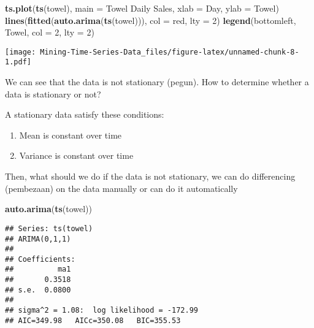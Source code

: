 \documentclass[
]{article}
\newenvironment{Shaded}{\begin{snugshade}}{\end{snugshade}}
\newcommand{\AttributeTok}[1]{\textcolor[rgb]{0.13,0.29,0.53}{#1}}
\newcommand{\DecValTok}[1]{\textcolor[rgb]{0.00,0.00,0.81}{#1}}
\newcommand{\FunctionTok}[1]{\textcolor[rgb]{0.13,0.29,0.53}{\textbf{#1}}}
\newcommand{\NormalTok}[1]{#1}
\newcommand{\StringTok}[1]{\textcolor[rgb]{0.31,0.60,0.02}{#1}}
\providecommand{\tightlist}{%
  \setlength{\itemsep}{0pt}\setlength{\parskip}{0pt}}
\begin{document}
\begin{Shaded}
\begin{Highlighting}[]
\FunctionTok{ts.plot}\NormalTok{(}\FunctionTok{ts}\NormalTok{(towel), }\AttributeTok{main =} \StringTok{\textquotesingle{}Towel Daily Sales\textquotesingle{}}\NormalTok{, }\AttributeTok{xlab =} \StringTok{\textquotesingle{}Day\textquotesingle{}}\NormalTok{, }\AttributeTok{ylab =} \StringTok{\textquotesingle{}Towel\textquotesingle{}}\NormalTok{)}
\FunctionTok{lines}\NormalTok{(}\FunctionTok{fitted}\NormalTok{(}\FunctionTok{auto.arima}\NormalTok{(}\FunctionTok{ts}\NormalTok{(towel))), }\AttributeTok{col =} \StringTok{\textquotesingle{}red\textquotesingle{}}\NormalTok{, }\AttributeTok{lty =} \DecValTok{2}\NormalTok{)}
\FunctionTok{legend}\NormalTok{(}\StringTok{\textquotesingle{}bottomleft\textquotesingle{}}\NormalTok{, }\StringTok{\textquotesingle{}Towel\textquotesingle{}}\NormalTok{, }\AttributeTok{col =} \DecValTok{2}\NormalTok{, }\AttributeTok{lty =} \DecValTok{2}\NormalTok{)}
\end{Highlighting}
\end{Shaded}

\texttt{[image: Mining-Time-Series-Data\_files/figure-latex/unnamed-chunk-8-1.pdf]}

We can see that the data is not stationary (pegun). How to determine
whether a data is stationary or not?

A stationary data satisfy these conditions:

\begin{enumerate}
\def\labelenumi{\arabic{enumi}.}
\tightlist
\item
  Mean is constant over time
\item
  Variance is constant over time
\end{enumerate}

Then, what should we do if the data is not stationary, we can do
differencing (pembezaan) on the data manually or can do it automatically

\begin{Shaded}
\begin{Highlighting}[]
\FunctionTok{auto.arima}\NormalTok{(}\FunctionTok{ts}\NormalTok{(towel))}
\end{Highlighting}
\end{Shaded}

\begin{verbatim}
## Series: ts(towel) 
## ARIMA(0,1,1) 
## 
## Coefficients:
##          ma1
##       0.3518
## s.e.  0.0800
## 
## sigma^2 = 1.08:  log likelihood = -172.99
## AIC=349.98   AICc=350.08   BIC=355.53
\end{verbatim}
\end{document}
